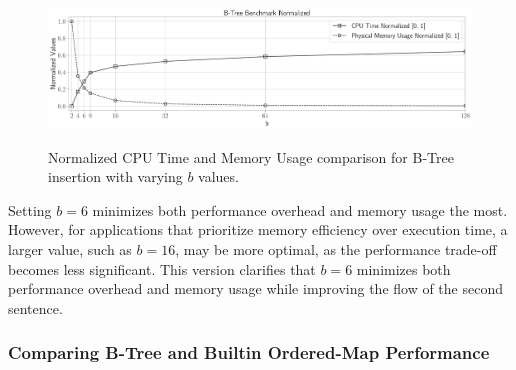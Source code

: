 \documentclass[12pt]{article}
\begin{document}
\begin{figure}[H]
	\centering
	\begin{minipage}{1\textwidth}
		\centering
		\includegraphics[width=\linewidth]{../notebook/plot/b-tree_benchmark_normalized.pdf}
		\label{fig:benchmark_normalized}
	\end{minipage}
	\caption{Normalized CPU Time and Memory Usage comparison for B-Tree insertion with varying $b$ values.}
\end{figure}

Setting $b = 6$ minimizes both performance overhead and memory usage the most. However, for applications that prioritize memory efficiency over execution time, a larger value, such as $b = 16$, may be more optimal, as the performance trade-off becomes less significant. This version clarifies that $b = 6$ minimizes both performance overhead and memory usage while improving the flow of the second sentence.

\subsubsection*{Comparing B-Tree and Builtin Ordered-Map Performance}
\end{document}
